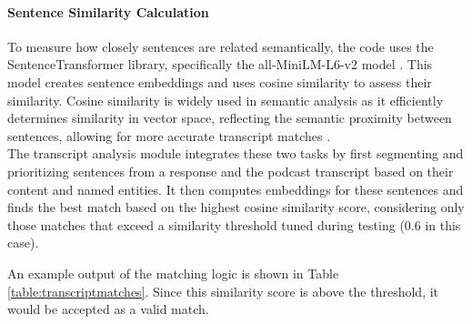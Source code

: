 \documentclass[12pt]{report}
\begin{document}
\begin{myfont}
        \paragraph{Sentence Similarity Calculation} To measure how closely sentences are related semantically, the code uses the SentenceTransformer library, specifically the all-MiniLM-L6-v2 model \citep{reimers2019sentence}. This model creates sentence embeddings and uses cosine similarity to assess their similarity. Cosine similarity is widely used in semantic analysis as it efficiently determines similarity in vector space, reflecting the semantic proximity between sentences, allowing for more accurate transcript matches \citep{reimers2019sentence}.\\

        \indent The transcript analysis module integrates these two tasks by first segmenting and prioritizing sentences from a response and the podcast transcript based on their content and named entities. It then computes embeddings for these sentences and finds the best match based on the highest cosine similarity score, considering only those matches that exceed a similarity threshold tuned during testing (0.6 in this case).
        
        \indent An example output of the matching logic is shown in Table \ref{table:transcriptmatches}. Since this similarity score is above the threshold, it would be accepted as a valid match.

        \begin{table}[h]
            \caption{Example transcript match.}
            \label{table:transcriptmatches}
            \centering
        \end{table}


\end{myfont}
\end{document}
